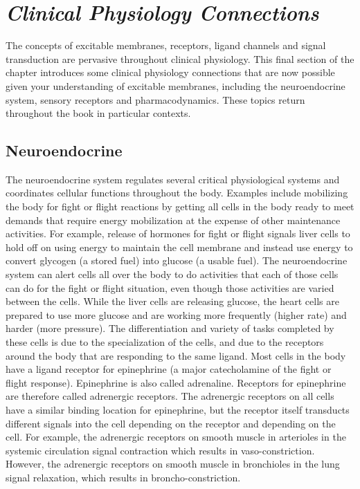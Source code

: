 \section{\textit{Clinical Physiology Connections}}

The concepts of excitable membranes, receptors, ligand channels and signal transduction are pervasive throughout clinical physiology. This final section of the chapter introduces some clinical physiology connections that are now possible given your understanding of excitable membranes, including the neuroendocrine system, sensory receptors and pharmacodynamics. These topics return throughout the book in particular contexts.

\subsection{Neuroendocrine}

The neuroendocrine system regulates several critical physiological systems and coordinates cellular functions throughout the body. Examples include mobilizing the body for fight or flight reactions by getting all cells in the body ready to meet demands that require energy mobilization at the expense of other maintenance activities. For example, release of hormones for fight or flight signals liver cells to hold off on using energy to maintain the cell membrane and instead use energy to convert glycogen (a stored fuel) into glucose (a usable fuel). The neuroendocrine system can alert cells all over the body to do activities that each of those cells can do for the fight or flight situation, even though those activities are varied between the cells. While the liver cells are releasing glucose, the heart cells are prepared to use more glucose and are working more frequently (higher rate) and harder (more pressure). The differentiation and variety of tasks completed by these cells is due to the specialization of the cells, and due to the receptors around the body that are responding to the same ligand. Most cells in the body have a ligand receptor for epinephrine (a major catecholamine of the fight or flight response). Epinephrine is also called adrenaline. Receptors for epinephrine are therefore called adrenergic receptors. The adrenergic receptors on all cells have a similar binding location for epinephrine, but the receptor itself transducts different signals into the cell depending on the receptor and depending on the cell. For example, the adrenergic receptors on smooth muscle in arterioles in the systemic circulation signal contraction which results in vaso-constriction. However, the adrenergic receptors on smooth muscle in bronchioles in the lung signal relaxation, which results in broncho-constriction.

